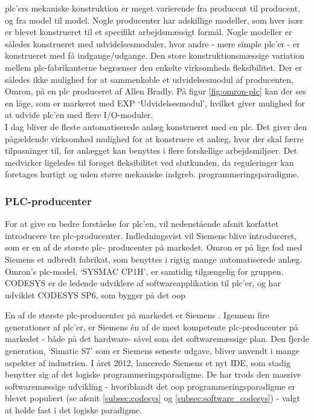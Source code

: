 
\noindent \gls{plc}'ers mekaniske konstruktion er meget varierende fra producent til producent, og fra model til model. Nogle producenter har adskillige modeller, som hver især er blevet konstrueret til et specifikt arbejdsmæssigt formål. Nogle modeller er således konstrueret med udvidelsesmoduler, hvor andre - mere simple \gls{plc}'er - er konstrueret med få indgange/udgange. 
Den store konstruktionsmæssige variation mellem \gls{plc}-fabrikanterne begrænser den enkelte virksomheds fleksibilitet. Der er således ikke mulighed for at sammenkoble et udvidelsesmodul af producenten, Omron, på en \gls{plc} produceret af Allen Bradly\cite{PLC-comb}. På figur \ref{fig:omron-plc} kan der ses en låge, som er markeret med EXP \enquote*{Udvidelsesmodul}, hvilket giver mulighed for at udvide \gls{plc}'en med flere I/O-moduler.\\

\noindent I dag bliver de fleste automatiserede anlæg konstrueret med en \gls{plc}. Det giver den pågældende virksomhed mulighed for at konstruere et anlæg, hvor der skal færre tilpasninger til, før anlægget kan benyttes i flere forskellige arbejdsmiljøer. Det medvirker ligeledes til forøget fleksibilitet ved slutkunden, da reguleringer kan foretages hurtigt og uden større mekaniske indgreb.
 programmeringsparadigme.

\subsubsection{PLC-producenter}
\label{sec:plc}
\noindent For at give en bedre forståelse for \gls{plc}'en, vil nedenstående afsnit korfattet introducere tre \gls{plc}-producenter. Indledningsvist vil Siemens blive introduceret, som er en af de største \gls{plc}-
producenter på markedet. Omron er på lige fod med Siemens et udbredt fabrikat, som benyttes i rigtig mange automatiserede anlæg. Omron's \gls{plc}-model, \enquote*{SYSMAC CP1H}, er samtidig tilgængelig for gruppen. CODESYS er de ledende udviklere af softwareapplikation til \gls{plc}'er, og har udviklet CODESYS SP6, som bygger på det \gls{oop}

\label{subsec:siemens}
\noindent En af de største \gls{plc}-producenter på markedet er Siemens \cite{plc-marked-shares}. Igennem fire generationer af \gls{plc}'er, er Siemens én af de mest kompetente \gls{plc}-producenter på markedet - både på det hardware- såvel som det softwaremæssige plan. Den fjerde generation, \enquote*{Simatic S7} som er Siemens seneste udgave, bliver anvendt i mange aspekter af industrien. I året 2012, lancerede Siemens et nyt IDE, som stadig benytter sig af det logiske programmeringsparadigme. De har trods den massive softwaremæssige udvikling - hvoriblandt det \gls{oop} programmeringsparadigme er blevet populært (se afsnit \ref{subsec:codesys} og \ref{subsec:software_codesys}) - valgt at holde fast i det logiske paradigme. \\

